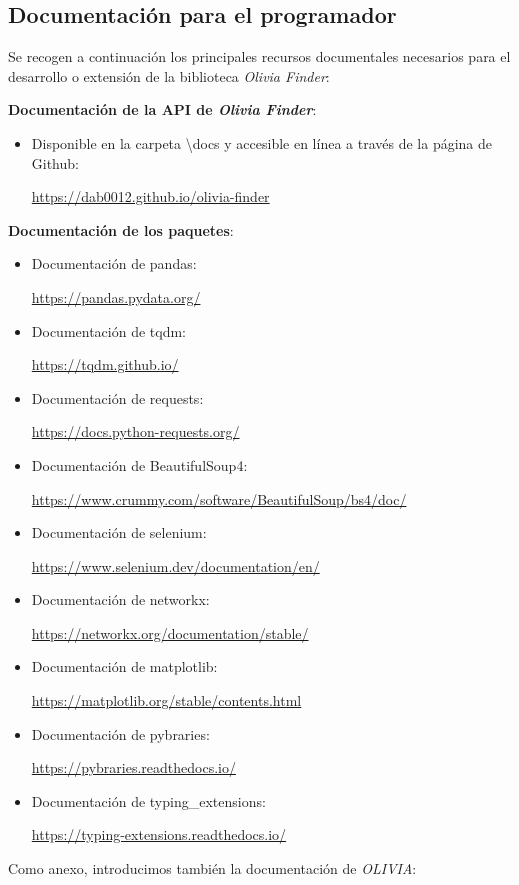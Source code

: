\subsection{Documentación para el programador}

Se recogen a continuación los principales recursos documentales necesarios para el desarrollo o extensión de la biblioteca \textit{Olivia Finder}:

\textbf{Documentación de la API de \textit{Olivia Finder}}:
\begin{itemize}
\item Disponible en la carpeta \textbackslash docs y accesible en línea a través de la página de Github: 

\url{https://dab0012.github.io/olivia-finder}
\end{itemize}

\textbf{Documentación de los paquetes}:
\begin{itemize}
\item Documentación de pandas:

\url{https://pandas.pydata.org/}
\item Documentación de tqdm:
 
\url{https://tqdm.github.io/}
\item Documentación de requests:
 
\url{https://docs.python-requests.org/}
\item Documentación de BeautifulSoup4:
 
\url{https://www.crummy.com/software/BeautifulSoup/bs4/doc/}
\item Documentación de selenium: 
 
\url{https://www.selenium.dev/documentation/en/}
\item Documentación de networkx: 
 
\url{https://networkx.org/documentation/stable/}
\item Documentación de matplotlib: 
 
\url{https://matplotlib.org/stable/contents.html}
\item Documentación de pybraries: 
 
\url{https://pybraries.readthedocs.io/}
\item Documentación de typing\_extensions: 
 
\url{https://typing-extensions.readthedocs.io/}
\end{itemize}

Como anexo, introducimos también la documentación de \textit{OLIVIA}:


